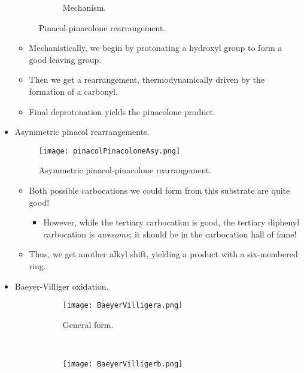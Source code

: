 \documentclass[../notes.tex]{subfiles}
\begin{document}
\begin{itemize}
\begin{figure}[h!]
\begin{subfigure}[b]{\linewidth}
            \caption{Mechanism.}
            \label{fig:pinacolPinacoloneb}
        \end{subfigure}
        \caption{Pinacol-pinacolone rearrangement.}
        \label{fig:pinacolPinacolone}
    \end{figure}
    \begin{itemize}
        \item Mechanistically, we begin by protonating a hydroxyl group to form a good leaving group.
        \item Then we get a rearrangement, thermodynamically driven by the formation of a carbonyl.
        \item Final deprotonation yields the pinacolone product.
    \end{itemize}
    \item Asymmetric pinacol rearrangements.
    \begin{figure}[H]
        \centering
        \texttt{[image: pinacolPinacoloneAsy.png]}
        \caption{Asymmetric pinacol-pinacolone rearrangement.}
        \label{fig:pinacolPinacoloneAsy}
    \end{figure}
    \begin{itemize}
        \item Both possible carbocations we could form from this substrate are quite good!
        \begin{itemize}
            \item However, while the tertiary carbocation is good, the tertiary diphenyl carbocation is \emph{awesome}; it should be in the carbocation hall of fame!
        \end{itemize}
        \item Thus, we get another alkyl shift, yielding a product with a six-membered ring.
    \end{itemize}
    \item Baeyer-Villiger oxidation.
    \begin{figure}[h!]
        \centering
        \begin{subfigure}[b]{\linewidth}
            \centering
            \texttt{[image: BaeyerVilligera.png]}
            \caption{General form.}
            \label{fig:BaeyerVilligera}
        \end{subfigure}\\[2em]
        \begin{subfigure}[b]{\linewidth}
            \centering
            \texttt{[image: BaeyerVilligerb.png]}

\end{subfigure}
\end{figure}
\end{itemize}
\end{document}
